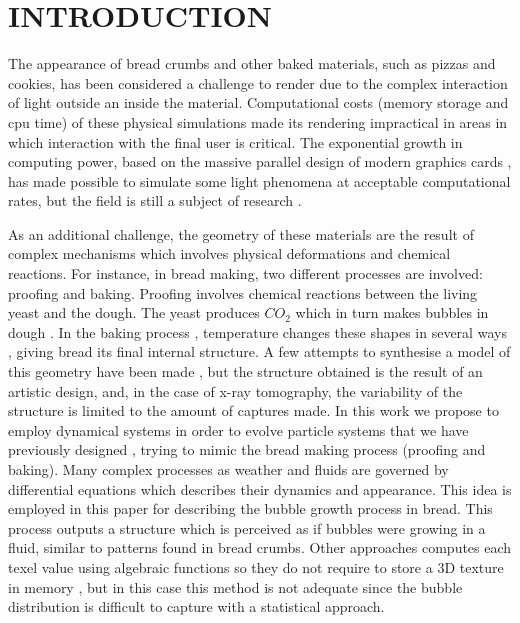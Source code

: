 \documentclass[oneside,a4paper,english,links]{amca}
\begin{document}
\section{INTRODUCTION}

The appearance of bread crumbs and other baked materials, such as pizzas and cookies, has been considered a challenge to render due to the complex interaction of light outside an inside the material. Computational costs (memory storage and cpu time) of these physical simulations made its rendering impractical in areas in which interaction with the final user is critical. The exponential growth in computing power, based on the massive parallel design of modern graphics cards \citep{Yeo09,Harris06}, has made possible to simulate some light phenomena at acceptable computational rates, but the field is still a subject of research \citep{Voglsam2013}.

As an additional challenge, the geometry of these materials are the result of complex mechanisms which involves physical deformations and chemical reactions. For instance, in bread making, two different processes are involved: proofing and baking. Proofing involves chemical reactions between the living yeast and the dough. The yeast produces $CO_{2}$ which in turn makes bubbles in dough \citep{Shah1998}. In the baking process \citep{Mondal2008}, temperature changes these shapes in several ways \citep{Scanlon2001}, giving bread its final internal structure. A few attempts to synthesise a model of this geometry have been made \citep{VanDyck2014,Cho2007}, but the structure obtained is the result of an artistic design, and, in the case of x-ray tomography, the variability of the structure is limited to the amount of captures made. In this work we propose to employ dynamical systems \citep{Strogatz2001} in order to evolve particle systems \citep{Reeves83} that we have previously designed \citep{Baravalle2011}, trying to mimic the bread making process (proofing and baking). Many complex processes as weather and fluids are governed by differential equations which describes their dynamics and appearance. This idea is employed in this paper for describing the bubble growth process in bread. This process outputs a structure which is perceived as if bubbles were growing in a fluid, similar to patterns found in bread crumbs. Other approaches computes each texel value using algebraic functions so they do not require to store a 3D texture in memory \citep{Perlin1989}, but in this case this method is not adequate since the bubble distribution is difficult to capture with a statistical approach.
\end{document}
